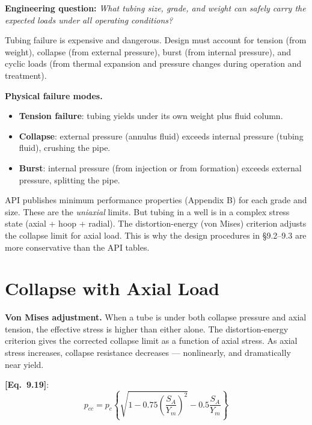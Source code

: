 \documentclass[11pt,a4paper,openany]{book}
\newcommand{\eqrefbook}[1]{\textcolor{blue!60!black}{\textbf{[Eq.~#1]}}}
\begin{document}
\begin{purpose}
\textbf{Engineering question:} \emph{What tubing size, grade, and
weight can safely carry the expected loads under all operating
conditions?}

Tubing failure is expensive and dangerous. Design must account for
tension (from weight), collapse (from external pressure), burst (from
internal pressure), and cyclic loads (from thermal expansion and
pressure changes during operation and treatment).
\end{purpose}

\begin{theory}
\textbf{Physical failure modes.}
\begin{itemize}
  \item \textbf{Tension failure}: tubing yields under its own weight
        plus fluid column.
  \item \textbf{Collapse}: external pressure (annulus fluid) exceeds
        internal pressure (tubing fluid), crushing the pipe.
  \item \textbf{Burst}: internal pressure (from injection or from
        formation) exceeds external pressure, splitting the pipe.
\end{itemize}

API publishes minimum performance properties (Appendix B) for each
grade and size. These are the \emph{uniaxial} limits. But tubing in a
well is in a complex stress state (axial + hoop + radial). The
distortion-energy (von Mises) criterion adjusts the collapse limit
for axial load. This is why the design procedures in §9.2--9.3 are
more conservative than the API tables.
\end{theory}

\section{Collapse with Axial Load}

\begin{theory}
\textbf{Von Mises adjustment.} When a tube is under both collapse
pressure and axial tension, the effective stress is higher than
either alone. The distortion-energy criterion gives the corrected
collapse limit as a function of axial stress. As axial stress
increases, collapse resistance decreases — nonlinearly, and
dramatically near yield.
\end{theory}

\eqrefbook{9.19}:
\begin{equation}
  p_{cc} = p_c\left\{\sqrt{1 - 0.75\left(\frac{S_A}{Y_m}\right)^2}
  - 0.5\frac{S_A}{Y_m}\right\}
\end{equation}
\end{document}
